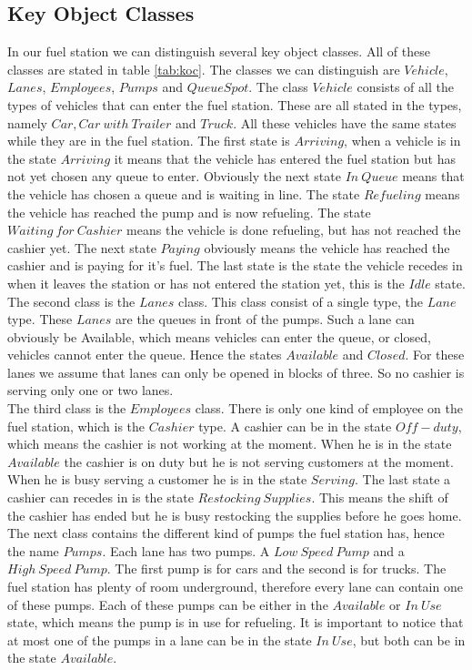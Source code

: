 \subsection{Key Object Classes}
In our fuel station we can distinguish several key object classes. All of these classes are stated in table \ref{tab:koc}. The classes we can distinguish are $Vehicle$, $Lanes$, $Employees$, $Pumps$ and $Queue Spot$. The class $Vehicle$ consists of all the types of vehicles that can enter the fuel station. These are all stated in the types, namely $Car, Car \ with \ Trailer$ and $Truck$. All these vehicles have the same states while they are in the fuel station. The first state is $Arriving$, when a vehicle is in the state $Arriving$ it means that the vehicle has entered the fuel station but has not yet chosen any queue to enter. Obviously the next state $In \ Queue$ means that the vehicle has chosen a queue and is waiting in line. The state $Refueling$ means the vehicle has reached the pump and is now refueling. The state $Waiting \ for \ Cashier$ means the vehicle is done refueling, but has not reached the cashier yet. The next state $Paying$ obviously means the vehicle has reached the cashier and is paying for it's fuel. The last state is the state the vehicle recedes in when it leaves the station or has not entered the station yet, this is the $Idle$ state. \\
\indent The second class is the $Lanes$ class. This class consist of a single type, the $Lane$ type. These $Lanes$ are the queues in front of the pumps. Such a lane can obviously be Available, which means vehicles can enter the queue, or closed, vehicles cannot enter the queue. Hence the states $Available$ and $Closed$. For these lanes we assume that lanes can only be opened in blocks of three. So no cashier is serving only one or two lanes.\\
\indent The third class is the $Employees$ class. There is only one kind of employee on the fuel station, which is the $Cashier$ type. A cashier can be in the state $Off-duty$, which means the cashier is not working at the moment. When he is in the state $Available$ the cashier is on duty but he is not serving customers at the moment. When he is busy serving a customer he is in the state $Serving$. The last state a cashier can recedes in is the state $Restocking \ Supplies$. This means the shift of the cashier has ended but he is busy restocking the supplies before he goes home. \\
\indent The next class contains the different kind of pumps the fuel station has, hence the name $Pumps$. Each lane has two pumps. A $Low \  Speed \ Pump$ and a $High \ Speed \ Pump$. The first pump is for cars and the second is for trucks. The fuel station has plenty of room underground, therefore every lane can contain one of these pumps. Each of these pumps can be either in the $Available$ or $In \ Use$ state, which means the pump is in use for refueling. It is important to notice that at most one of the pumps in a lane can be in the state $In \ Use$, but both can be in the state $Available$.\\
